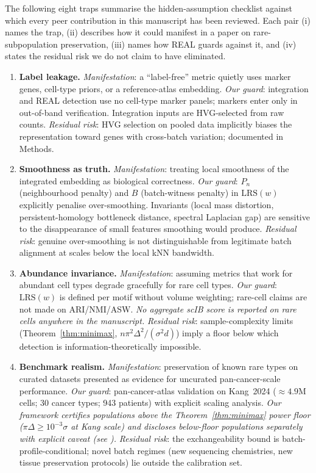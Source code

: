 The following eight traps summarise the hidden-assumption checklist against which every peer contribution in this manuscript has been reviewed. Each pair (i) names the trap, (ii) describes how it could manifest in a paper on rare-subpopulation preservation, (iii) names how REAL guards against it, and (iv) states the residual risk we do not claim to have eliminated.

\begin{enumerate}[label=\textbf{S0.\arabic*}, leftmargin=*]
  \item \textbf{Label leakage.}
    \emph{Manifestation}: a ``label-free'' metric quietly uses marker genes, cell-type priors, or a reference-atlas embedding.
    \emph{Our guard}: integration and REAL detection use no cell-type marker panels; markers enter only in out-of-band verification. Integration inputs are HVG-selected from raw counts.
    \emph{Residual risk}: HVG selection on pooled data implicitly biases the representation toward genes with cross-batch variation; documented in Methods.

  \item \textbf{Smoothness as truth.}
    \emph{Manifestation}: treating local smoothness of the integrated embedding as biological correctness.
    \emph{Our guard}: $P_n$ (neighbourhood penalty) and $B$ (batch-witness penalty) in $\mathrm{LRS}(w)$ explicitly penalise over-smoothing. Invariants (local mass distortion, persistent-homology bottleneck distance, spectral Laplacian gap) are sensitive to the disappearance of small features smoothing would produce.
    \emph{Residual risk}: genuine over-smoothing is not distinguishable from legitimate batch alignment at scales below the local kNN bandwidth.

  \item \textbf{Abundance invariance.}
    \emph{Manifestation}: assuming metrics that work for abundant cell types degrade gracefully for rare cell types.
    \emph{Our guard}: $\mathrm{LRS}(w)$ is defined per motif without volume weighting; rare-cell claims are not made on ARI/NMI/ASW. \emph{No aggregate scIB score is reported on rare cells anywhere in the manuscript.}
    \emph{Residual risk}: sample-complexity limits (Theorem~\ref{thm:minimax}, $n \pi^2 \Delta^2/(\sigma^2 d)$) imply a floor below which detection is information-theoretically impossible.

  \item \textbf{Benchmark realism.}
    \emph{Manifestation}: preservation of known rare types on curated datasets presented as evidence for uncurated pan-cancer-scale performance.
    \emph{Our guard}: pan-cancer-atlas validation on Kang~2024 ($\approx 4.9$M cells; 30 cancer types; 943 patients) with explicit scaling analysis. \emph{Our framework certifies populations above the Theorem~\ref{thm:minimax} power floor ($\pi\Delta \geq 10^{-3}\sigma$ at Kang scale) and discloses below-floor populations separately with explicit caveat (see ).}
    \emph{Residual risk}: the exchangeability bound is batch-profile-conditional; novel batch regimes (new sequencing chemistries, new tissue preservation protocols) lie outside the calibration set.


\end{enumerate}
